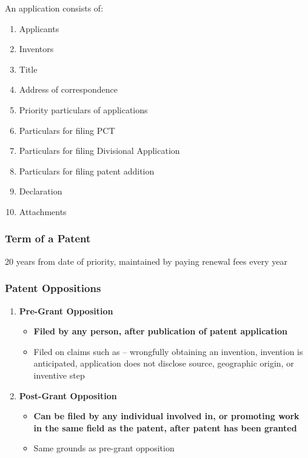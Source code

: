 \documentclass{article}
\begin{document}
An application consists of:

\begin{enumerate}
    \item Applicants
    \item Inventors
    \item Title
    \item Address of correspondence
    \item Priority particulars of applications
    \item Particulars for filing PCT
    \item Particulars for filing Divisional Application
    \item Particulars for filing patent addition
    \item Declaration
    \item Attachments
\end{enumerate}

\subsubsection{Term of a Patent}

20 years from date of priority, maintained by paying renewal fees every year

\subsubsection{Patent Oppositions}

\begin{enumerate}
    \item \textbf{Pre-Grant Opposition}
    \begin{itemize}
    \item \textbf{Filed by any person, after publication of patent application}
    \item Filed on claims such as -- wrongfully obtaining an invention, invention is anticipated, application does not disclose source, geographic origin, or inventive step
    \end{itemize}
    
    \item \textbf{Post-Grant Opposition}
    \begin{itemize}
        \item \textbf{Can be filed by any individual involved in, or promoting work in the same field as the patent, after patent has been granted}
        \item Same grounds as pre-grant opposition
    \end{itemize}
\end{enumerate}
\end{document}
